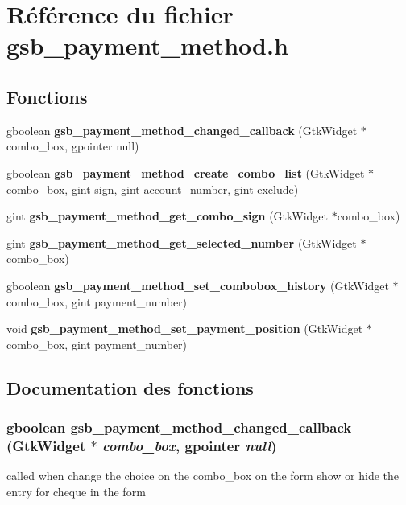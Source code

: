 \section{Référence du fichier gsb\_\-payment\_\-method.h}
\label{gsb__payment__method_8h}
\subsection*{Fonctions}
\begin{DoxyCompactItemize}
\item 
gboolean {\bf gsb\_\-payment\_\-method\_\-changed\_\-callback} (GtkWidget $\ast$combo\_\-box, gpointer null)
\item 
gboolean {\bf gsb\_\-payment\_\-method\_\-create\_\-combo\_\-list} (GtkWidget $\ast$combo\_\-box, gint sign, gint account\_\-number, gint exclude)
\item 
gint {\bf gsb\_\-payment\_\-method\_\-get\_\-combo\_\-sign} (GtkWidget $\ast$combo\_\-box)
\item 
gint {\bf gsb\_\-payment\_\-method\_\-get\_\-selected\_\-number} (GtkWidget $\ast$combo\_\-box)
\item 
gboolean {\bf gsb\_\-payment\_\-method\_\-set\_\-combobox\_\-history} (GtkWidget $\ast$combo\_\-box, gint payment\_\-number)
\item 
void {\bf gsb\_\-payment\_\-method\_\-set\_\-payment\_\-position} (GtkWidget $\ast$combo\_\-box, gint payment\_\-number)
\end{DoxyCompactItemize}


\subsection{Documentation des fonctions}
\subsubsection[{gsb\_\-payment\_\-method\_\-changed\_\-callback}]{\setlength{\rightskip}{0pt plus 5cm}gboolean gsb\_\-payment\_\-method\_\-changed\_\-callback (GtkWidget $\ast$ {\em combo\_\-box}, \/  gpointer {\em null})}\label{gsb__payment__method_8h_a5b947653cf00a61d5afa4870c4c63498}
called when change the choice on the combo\_\-box on the form show or hide the entry for cheque in the form


